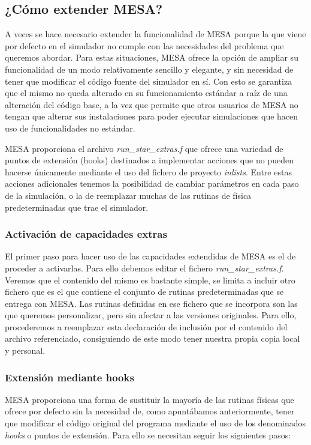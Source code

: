 \subsection{¿Cómo extender MESA?}
A veces se hace necesario extender la funcionalidad de MESA porque la que viene por defecto en el simulador no cumple con las necesidades del problema que queremos abordar. Para estas situaciones, MESA ofrece la opción de ampliar su funcionalidad de un modo relativamente sencillo y elegante, y sin necesidad de tener que modificar el código fuente del simulador en sí. Con esto se garantiza que el mismo no queda alterado en su funcionamiento estándar a raíz de una alteración del código base, a la vez que permite que otros usuarios de MESA no tengan que alterar sus instalaciones para poder ejecutar simulaciones que hacen uso de funcionalidades no estándar. \par

MESA proporciona el archivo \textit{run\_star\_extras.f} que ofrece una variedad de puntos de extensión (hooks) destinados a implementar acciones que no pueden hacerse únicamente mediante el uso del fichero de proyecto \textit{inlists}. Entre estas acciones adicionales tenemos la posibilidad de cambiar parámetros en cada paso de la simulación, o la de reemplazar muchas de las rutinas de física predeterminadas que trae el simulador.\par

\subsubsection{Activación de capacidades extras}
El primer paso para hacer uso de las capacidades extendidas de MESA es el de proceder a activarlas. Para ello debemos editar el fichero \textit{run\_star\_extras.f}. Veremos que el contenido del mismo es bastante simple, se limita a incluir otro fichero que es el que contiene el conjunto de rutinas predeterminadas que se entrega con MESA. Las rutinas definidas en ese fichero que se incorpora son las que queremos personalizar, pero sin afectar a las versiones originales. Para ello, procederemos a reemplazar esta declaración de inclusión por el contenido del archivo referenciado, consiguiendo de este modo tener nuestra propia copia local y personal.\par

\subsubsection{Extensión mediante hooks}
MESA proporciona una forma de sustituir la mayoría de las rutinas físicas que ofrece por defecto sin la necesidad de, como apuntábamos anteriormente, tener que modificar el código original del programa mediante el uso de los denominados \textit{hooks} o puntos de extensión. Para ello se necesitan seguir los siguientes pasos:

